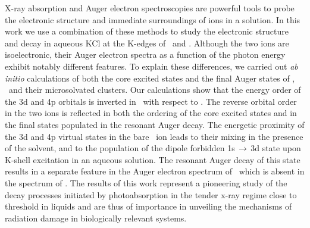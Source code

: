 X-ray absorption and Auger electron spectroscopies are powerful tools to probe the electronic structure and immediate surroundings of ions in a solution. In this work we use a combination of these methods to study the electronic structure and decay in aqueous KCl at the K-edges of \ki~and \cli. Although the two ions are isoelectronic, their Auger electron spectra as a function of the photon energy exhibit notably different features. To explain these differences, we carried out {\it ab initio} calculations of both the core excited states and the final Auger states of \ki, \cli~and their microsolvated clusters. Our calculations show that the energy order of the 3d and 4p orbitals is inverted in \ki~with respect to \cli. The reverse orbital order in the two ions is reflected in both the ordering of the core excited states and in the final states populated in the resonant Auger decay. The energetic proximity of the 3d and 4p virtual states in the bare \ki~ion leads to their mixing in the presence of the solvent, and to the population of the dipole forbidden 1s$\,\rightarrow\,$3d state upon K-shell excitation in an aqueous solution. The resonant Auger decay of this state results in a separate feature in the Auger electron spectrum of \ki~which is absent in the spectrum of \cli. The results of this work represent a pioneering study of the decay processes initiated by photoabsorption in the tender x-ray regime close to threshold in liquids and are thus of importance in unveiling the mechanisms of radiation damage in biologically relevant systems.

